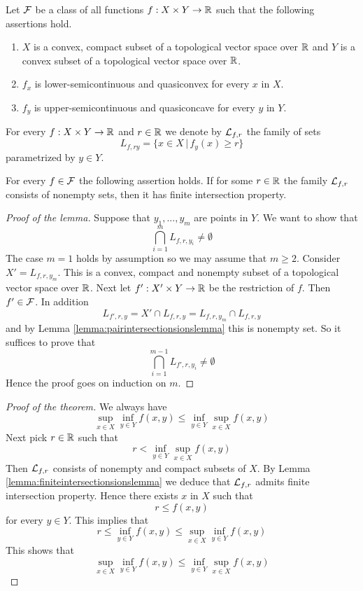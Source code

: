 \noindent
Let ${\mathcal F}$ be a class of all functions $f:X\times Y\rightarrow {\mathbb R}$ such that the following assertions hold.
\begin{enumerate}[label=\textbf{(\arabic*)}, leftmargin=3.0em]
\item $X$ is a convex, compact subset of a topological vector space over ${\mathbb R}$ and $Y$ is a convex subset of a topological vector space over ${\mathbb R}$.
\item $f_x$ is lower-semicontinuous and quasiconvex for every $x$ in $X$.
\item $f_y$ is upper-semicontinuous and quasiconcave for every $y$ in $Y$.
\end{enumerate}
For every $f:X\times Y\rightarrow {\mathbb R}$ and $r\in {\mathbb R}$ we denote by ${\mathcal L}_{f,r}$ the family of sets
$$L_{f,ry} = \big\{x\in X\,\big|\,f_y(x)\geq r \big\}$$
parametrized by $y\in Y$.

\begin{lemma}\label{lemma:finiteintersectionsionslemma}
For every $f\in {\mathcal F}$ the following assertion holds. If for some $r\in {\mathbb R}$ the family ${\mathcal L}_{f,r}$ consists of nonempty sets, then it has finite intersection property.
\end{lemma}
\begin{proof}[Proof of the lemma]
Suppose that $y_1,...,y_{m}$ are points in $Y$. We want to show that
$$\bigcap_{i=1}^{m}L_{f,r,y_i} \neq \emptyset$$
The case $m=1$ holds by assumption so we may assume that $m\geq 2$. Consider $X' = L_{f,r,y_{m}}$. This is a convex, compact and nonempty subset of a topological vector space over ${\mathbb R}$. Next let $f':X'\times Y\rightarrow {\mathbb R}$ be the restriction of $f$. Then $f'\in {\mathcal F}$. In addition
$$L_{f',r,y} = X' \cap L_{f,r,y} = L_{f,r,y_{m}} \cap L_{f,r,y}$$
and by Lemma \ref{lemma:pairintersectionsionslemma} this is nonempty set. So it suffices to prove that
$$\bigcap_{i=1}^{m-1} L_{f',r,y_i} \neq \emptyset$$
Hence the proof goes on induction on $m$. 
\end{proof}

\begin{proof}[Proof of the theorem]
We always have
$$\sup_{x\in X}\inf_{y\in Y}f(x,y) \leq \inf_{y\in Y}\sup_{x\in X}f(x,y)$$
Next pick $r\in {\mathbb R}$ such that
$$r < \inf_{y\in Y}\sup_{x\in X}f(x,y)$$
Then ${\mathcal L}_{f,r}$ consists of nonempty and compact subsets of $X$. By Lemma \ref{lemma:finiteintersectionsionslemma} we deduce that ${\mathcal L}_{f,r}$ admits finite intersection property. Hence there exists $x$ in $X$ such that
$$r \leq f(x,y)$$
for every $y\in Y$. This implies that
$$r\leq \inf_{y\in Y}f(x,y) \leq \sup_{x\in X}\inf_{y\in Y}f(x,y)$$
This shows that
$$\sup_{x\in X}\inf_{y\in Y}f(x,y) \leq \inf_{y\in Y}\sup_{x\in X}f(x,y)$$
\end{proof}

